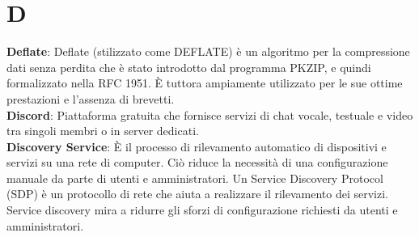 \section{D}
\textbf{Deflate}: Deflate (stilizzato come DEFLATE) è un algoritmo per la compressione dati senza perdita che è stato introdotto dal programma PKZIP, e quindi formalizzato nella RFC 1951. È tuttora ampiamente utilizzato per le sue ottime prestazioni e l'assenza di brevetti.\\
\textbf{Discord}: Piattaforma gratuita che fornisce servizi di chat vocale, testuale e video tra singoli membri o in server dedicati.\\
\textbf{Discovery Service}: È il processo di rilevamento automatico di dispositivi e servizi su una rete di computer. Ciò riduce la necessità di una configurazione manuale da parte di utenti e amministratori. Un Service Discovery Protocol (SDP) è un protocollo di rete che aiuta a realizzare il rilevamento dei servizi. Service discovery mira a ridurre gli sforzi di configurazione richiesti da utenti e amministratori.\\